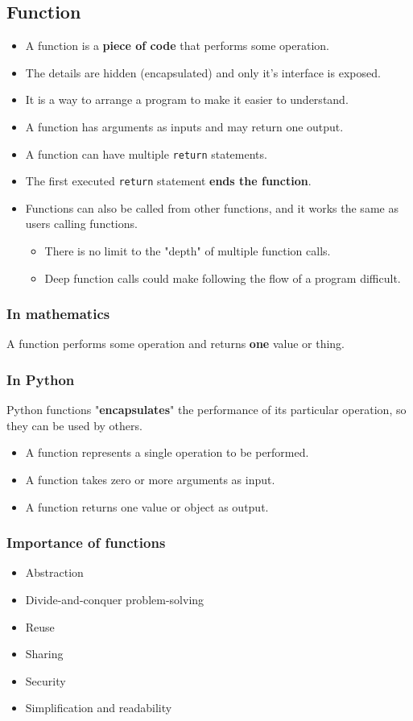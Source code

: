 \documentclass[11pt]{article}
\begin{document}
\subsection{Function}
\label{sec:org701da8e}
\begin{itemize}
\item A function is a \textbf{piece of code} that performs some operation.
\item The details are hidden (encapsulated) and only it's interface is exposed.
\item It is a way to arrange a program to make it easier to understand.
\item A function has arguments as inputs and may return one output.
\item A function can have multiple \texttt{return} statements.
\item The first executed \texttt{return} statement \textbf{ends the function}.
\item Functions can also be called from other functions, and it works the same as users calling functions.
\begin{itemize}
\item There is no limit to the "depth" of multiple function calls.
\item Deep function calls could make following the flow of a program difficult.
\end{itemize}
\end{itemize}
\subsubsection{In mathematics}
\label{sec:orgb3c6e40}
A function performs some operation and returns \textbf{one} value or thing.
\subsubsection{In Python}
\label{sec:orgc29363f}
Python functions "\textbf{encapsulates}" the performance of its particular operation, so they can be used by others.
\begin{itemize}
\item A function represents a single operation to be performed.
\item A function takes zero or more arguments as input.
\item A function returns one value or object as output.
\end{itemize}
\subsubsection{Importance of functions}
\label{sec:org768bb02}
\begin{itemize}
\item Abstraction
\item Divide-and-conquer problem-solving
\item Reuse
\item Sharing
\item Security
\item Simplification and readability
\end{itemize}
\end{document}
